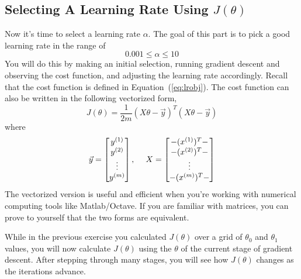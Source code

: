 \documentclass[10pt,a4paper]{article}
\begin{document}
\subsection{Selecting A Learning Rate Using $J(\theta)$}
%
  Now it's time to select a learning rate $\alpha.$ The goal of this part is to pick a good learning rate in the range of 
  \[ 0.001 \leq \alpha \leq 10 \]
  You will do this by making an initial selection, running gradient descent and observing the cost function, and adjusting the learning rate accordingly. Recall that the cost function is defined in Equation~(\ref{eq:lrobj}). The cost function can also be written in the following vectorized form,
  \begin{displaymath}
    J(\theta) = \frac{1}{2m}\left(X\theta-\vec{y}\right)^{T}(X\theta-\vec{y}) \nonumber
  \end{displaymath}  
  where
  \[
    \vec y = \begin{bmatrix}
      y^{(1)} \\
      y^{(2)} \\
      \vdots \\
      y^{(m)}
      \end{bmatrix}, \hspace{3ex}
    X = \begin{bmatrix}
      -(x^{(1)})^T- \\
      -(x^{(2)})^T- \\
      \vdots \\
      -(x^{(m)})^T-
      \end{bmatrix}
  \]
  The vectorized version is useful and efficient when you're working with numerical computing tools like Matlab/Octave. If you are familiar with matrices, you can prove to yourself that the two forms are equivalent.

  While in the previous exercise you calculated $J(\theta)$ over a grid of $\theta_0$ and $\theta_1$ values, you will now calculate $J(\theta)$ using the $\theta$ of the current stage of gradient descent. After stepping through many stages, you will see how $J(\theta)$ changes as the iterations advance.
\end{document}
